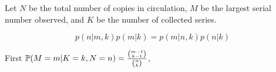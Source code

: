 \documentclass{article}
\begin{document}



Let $N$ be the total number of copies in circulation, $M$ be the largest serial number observed, and $K$ be the number of collected series.

\[p(n|m, k)p(m | k) = p(m | n, k)p(n | k)\]

First $\P(M = m | K = k, N = n) = \frac{{m-1 \choose k-1}}{{n\choose k}}$, 



 
\end{document}
